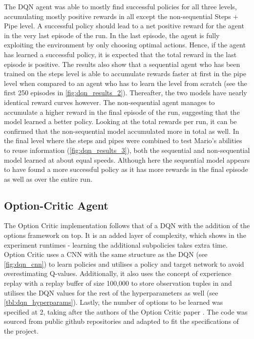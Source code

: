 \documentclass[notitlepage,a4paper,11pt]{article}
\begin{document}
The DQN agent was able to mostly find successful policies for all three levels, accumulating mostly positive rewards in all except the non-sequential Steps + Pipe level. A successful policy should lead to a net positive reward for the agent in the very last episode of the run. In the last episode, the agent is fully exploiting the environment by only choosing optimal actions. Hence, if the agent has learned a successful policy, it is expected that the total reward in the last episode is positive. The results also show that a sequential agent who has been trained on the steps level is able to accumulate rewards faster at first in the pipe level when compared to an agent who has to learn the level from scratch (see the first 250 episodes in \ref{fig:dqn_results_2}). Thereafter, the two models have nearly identical reward curves however. The non-sequential agent manages to accumulate a higher reward in the final episode of the run, suggesting that the model learned a better policy. Looking at the total rewards per run, it can be confirmed that the non-sequential model accumulated more in total as well. In the final level where the steps and pipes were combined to test Mario's abilities to reuse information (\ref{fig:dqn_results_3}), both the sequential and non-sequential model learned at about equal speeds. Although here the sequential model appears to have found a more successful policy as it has more rewards in the final episode as well as over the entire run.


\subsection{Option-Critic Agent}\label{oc_experiment}
The Option Critic implementation follows that of a DQN with the addition of the options framework on top. It is an added layer of complexity, which shows in the experiment runtimes - learning the additional subpolicies takes extra time. Option Critic uses a CNN with the same structure as the DQN (see \ref{fig:dqn_cnn}) to learn policies and utilises a policy and target network to avoid overestimating Q-values. Additionally, it also uses the concept of experience replay with a replay buffer of size 100,000 to store observation tuples in and utilises the DQN values for the rest of the hyperparameters as well (see \ref{tbl:dqn_hyperparams}). Lastly, the number of options to be learned was specified at 2, taking after the authors of the Option Critic paper \cite{bacon2017option}. The code was sourced from public github repositories \cite{oc_github} and adapted to fit the specifications of the project.
\end{document}
